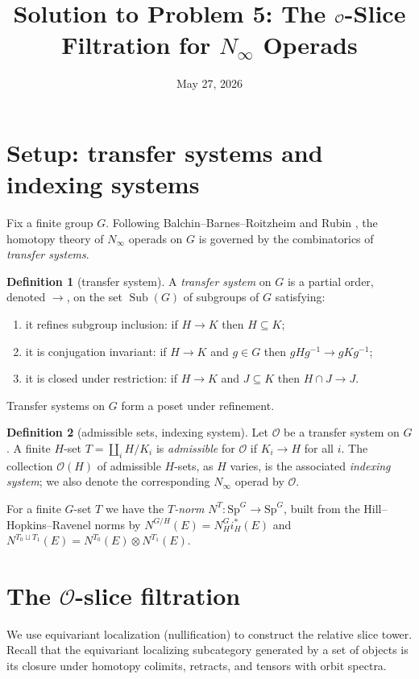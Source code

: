 \documentclass[11pt]{article}
\title{Solution to Problem 5: The $\aO$-Slice Filtration for $N_\infty$ Operads}
\author{}
\date{May 27, 2026}
\newcommand{\aO}{\mathcal{O}}
\newcommand{\Sp}{\mathrm{Sp}}
\newcommand{\Sub}{\operatorname{Sub}}
\theoremstyle{definition}
\newtheorem{definition}{Definition}
\begin{document}
\maketitle

\section*{Setup: transfer systems and indexing systems}

Fix a finite group $G$. Following Balchin--Barnes--Roitzheim \cite{BBR} and
Rubin \cite{Rubin}, the homotopy theory of $N_\infty$ operads on $G$ is governed
by the combinatorics of \emph{transfer systems}.

\begin{definition}[transfer system]
A \emph{transfer system} on $G$ is a partial order, denoted $\to$, on the set
$\Sub(G)$ of subgroups of $G$ satisfying:
\begin{enumerate}\setlength\itemsep{2pt}
\item it refines subgroup inclusion: if $H\to K$ then $H\subseteq K$;
\item it is conjugation invariant: if $H\to K$ and $g\in G$ then
$gHg^{-1}\to gKg^{-1}$;
\item it is closed under restriction: if $H\to K$ and $J\subseteq K$ then
$H\cap J\to J$.
\end{enumerate}
Transfer systems on $G$ form a poset under refinement.
\end{definition}

\begin{definition}[admissible sets, indexing system]
Let $\aO$ be a transfer system on $G$. A finite $H$-set $T=\coprod_i H/K_i$ is
\emph{admissible} for $\aO$ if $K_i\to H$ for all $i$. The collection $\aO(H)$ of
admissible $H$-sets, as $H$ varies, is the associated \emph{indexing system}; we
also denote the corresponding $N_\infty$ operad by $\aO$.
\end{definition}

For a finite $G$-set $T$ we have the \emph{$T$-norm}
$N^T:\Sp^G\to\Sp^G$, built from the Hill--Hopkins--Ravenel norms \cite{HHR16}
by $N^{G/H}(E)=N^G_H i_H^\ast(E)$ and $N^{T_0\sqcup T_1}(E)=N^{T_0}(E)\otimes
N^{T_1}(E)$.

\section*{The $\aO$-slice filtration}

We use equivariant localization (nullification) to construct the relative slice
tower. Recall that the equivariant localizing subcategory generated by a set of
objects is its closure under homotopy colimits, retracts, and tensors with orbit
spectra.
\end{document}
